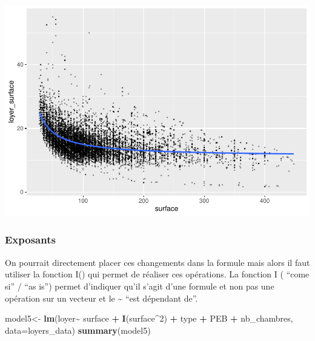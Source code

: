 \documentclass[
]{book}
\newenvironment{Shaded}{\begin{snugshade}}{\end{snugshade}}
\newcommand{\AttributeTok}[1]{\textcolor[rgb]{0.13,0.29,0.53}{#1}}
\newcommand{\DecValTok}[1]{\textcolor[rgb]{0.00,0.00,0.81}{#1}}
\newcommand{\FunctionTok}[1]{\textcolor[rgb]{0.13,0.29,0.53}{\textbf{#1}}}
\newcommand{\NormalTok}[1]{#1}
\newcommand{\OtherTok}[1]{\textcolor[rgb]{0.56,0.35,0.01}{#1}}
\newcommand{\SpecialCharTok}[1]{\textcolor[rgb]{0.81,0.36,0.00}{\textbf{#1}}}
\begin{document}
\includegraphics{manuel_geo_quanti_files/figure-latex/unnamed-chunk-15-1.pdf}

\hypertarget{exposants}{%
\subsubsection{Exposants}\label{exposants}}

On pourrait directement placer ces changements dans la formule mais
alors il faut utiliser la fonction I() qui permet de réaliser ces
opérations. La fonction I ( ``come si'' / ``as is'') permet d'indiquer qu'il
s'agit d'une formule et non pas une opération sur un vecteur et le \textasciitilde{}
``est dépendant de''.

\begin{Shaded}
\begin{Highlighting}[]
\NormalTok{model5}\OtherTok{\textless{}{-}} \FunctionTok{lm}\NormalTok{(loyer}\SpecialCharTok{\textasciitilde{}}\NormalTok{ surface }\SpecialCharTok{+} \FunctionTok{I}\NormalTok{(surface}\SpecialCharTok{\^{}}\DecValTok{2}\NormalTok{) }\SpecialCharTok{+}\NormalTok{  type }\SpecialCharTok{+}\NormalTok{ PEB }\SpecialCharTok{+}\NormalTok{ nb\_chambres, }\AttributeTok{data=}\NormalTok{loyers\_data)}
\FunctionTok{summary}\NormalTok{(model5)}
\end{Highlighting}
\end{Shaded}
\end{document}

